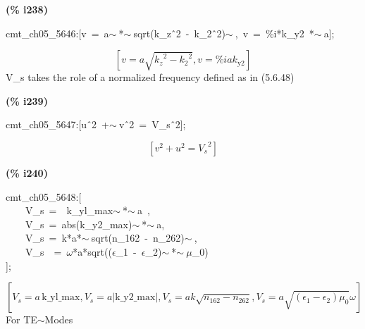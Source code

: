 \documentclass[fleqn]{article}
\begin{document}
\noindent
\begin{minipage}[t]{4.000000em}\color{red}\bfseries
(\% i238)	
\end{minipage}
\begin{minipage}[t]{\textwidth}\color{blue}
cmt\_ch05\_5646:[v\ =\ a\ensuremath{\sim\ }*\ensuremath{\sim\ }sqrt(k\_z\^\ 2\ -\ k\_2\^\ 2)\ensuremath{\sim\ },\ v\ =\ \%i*k\_y2\ *\ensuremath{\sim\ }a];
\end{minipage}
\[\displaystyle \tag{\% o238} 
\left[ v=a \sqrt{{{{k_z}}^{2}}-{{{k_2}}^{2}}}\operatorname{,}v=\% i a {k_{\ensuremath{\mathrm{y2}}}}\right] \mbox{}
\]
V\_s takes the role of a normalized frequency  defined as in (5.6.48)


\noindent
\begin{minipage}[t]{4.000000em}\color{red}\bfseries
(\% i239)	
\end{minipage}
\begin{minipage}[t]{\textwidth}\color{blue}
cmt\_ch05\_5647:[u\^\ 2\ +\ensuremath{\sim\ }v\^\ 2\ =\ V\_s\^\ 2];
\end{minipage}
\[\displaystyle \tag{\% o239} 
\left[ {{v}^{2}}+{{u}^{2}}={{{V_s}}^{2}}\right] \mbox{}
\]


\noindent
\begin{minipage}[t]{4.000000em}\color{red}\bfseries
(\% i240)	
\end{minipage}
\begin{minipage}[t]{\textwidth}\color{blue}
cmt\_ch05\_5648:[\\
\ \ \ \ V\_s\ =\ \ k\_yl\_max\ensuremath{\sim\ }*\ensuremath{\sim\ }a\ ,\\
\ \ \ \ V\_s\ =\ abs(k\_y2\_max)\ensuremath{\sim\ }*\ensuremath{\sim\ }a,\\
\ \ \ \ V\_s\ =\ k*a*\ensuremath{\sim\ }sqrt(n\_162\ -\ n\_262)\ensuremath{\sim\ },\ \\
\ \ \ \ V\_s\ \ =\ \ensuremath{\omega}*a*sqrt((\ensuremath{\epsilon}\_1\ -\ \ensuremath{\epsilon}\_2)\ensuremath{\sim\ }*\ensuremath{\sim\ }\ensuremath{\mu}\_0)\\
];
\end{minipage}
\[\displaystyle \tag{\% o240} 
\operatorname{[}{V_s}=a\, \ensuremath{\mathrm{k\_ yl\_ max}}\operatorname{,}{V_s}=a \left| \ensuremath{\mathrm{k\_ y2\_ max}}\right| \operatorname{,}{V_s}=a k \sqrt{{n_{\ensuremath{\mathrm{162}}}}-{n_{\ensuremath{\mathrm{262}}}}}\operatorname{,}{V_s}=a \sqrt{\left( {{\epsilon }_1}-{{\epsilon }_2}\right)  {{\mu }_0}} \omega \operatorname{]}\mbox{}
\]
For TE\ensuremath{\sim }Modes
\end{document}
